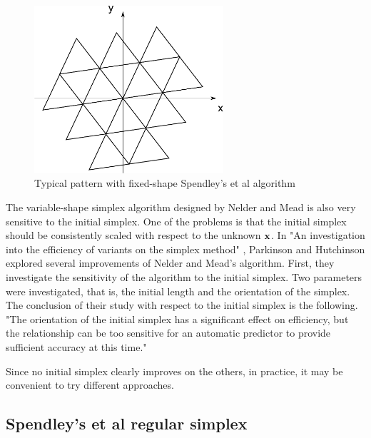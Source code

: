 \begin{figure}
\begin{center}
\includegraphics[width=7cm]{simplextheory/simplex_initialfixed.pdf}
\end{center}
\caption{Typical pattern with fixed-shape Spendley's et al algorithm}
\label{fig-nm-simplex-fixedshape}
\end{figure}

The variable-shape simplex algorithm designed by Nelder and Mead is also very
sensitive to the initial simplex.
One of the problems is that the initial simplex should be consistently scaled 
with respect to the unknown $\mathbf{x}$.
In "An investigation into the efficiency of variants on the simplex method" \cite{parkinson1972}, 
Parkinson and Hutchinson explored 
several improvements of Nelder and Mead's algorithm. First, they investigate the sensitivity
of the algorithm to the initial simplex. Two parameters were investigated,
that is, the initial length and the orientation of the simplex. 
The conclusion of their study with respect to the initial simplex is 
the following. "The orientation of the initial simplex has a significant effect 
on efficiency, but the relationship can be too sensitive for an automatic 
predictor to provide sufficient accuracy at this time."

Since no initial simplex clearly improves on the others, in practice, 
it may be convenient to try different approaches.

\subsection{Spendley's et al regular simplex}

